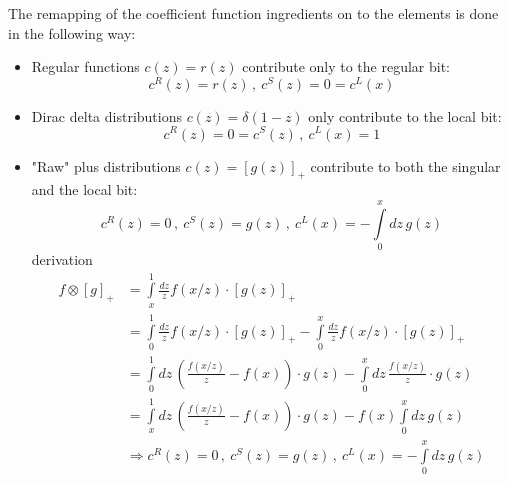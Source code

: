 The remapping of the coefficient function ingredients on to the \rsl elements
is done in the following way:
\begin{itemize}
  \item Regular functions $c(z) = r(z)$ contribute only to the regular bit:
    \begin{equation}
      c^R(z) = r(z)\,,~ c^S(z) = 0 = c^L(x)
    \end{equation}

  \item Dirac delta distributions $c(z) = \delta(1-z)$ only contribute to
    the local bit:
    \begin{equation}
      c^R(z) = 0 = c^S(z)\,,~ c^L(x) = 1
    \end{equation}

  \item "Raw" plus distributions $c(z) = \left[g(z)\right]_+$ contribute to
    both the singular and the local bit:
    \begin{equation}
      c^R(z) = 0\,,~ c^S(z) = g(z)\,,~ c^L(x) = -\int\limits_0^x\!dz\, g(z)
    \end{equation}
    derivation
    \begin{align}
        f \otimes [g]_+ &= \int\limits_x^1 \frac{dz}{z} f(x/z) \cdot \left[ g(z) \right]_+\\
          &= \int\limits_0^1 \frac{dz}{z} f(x/z) \cdot \left[ g(z) \right]_+ - \int\limits_0^x \frac{dz}{z} f(x/z) \cdot \left[ g(z) \right]_+\\
          &= \int\limits_0^1\!dz\, \left(\frac{f(x/z)}{z} - f(x)\right) \cdot g(z) - \int\limits_0^x\!dz\, \frac{f(x/z)}{z} \cdot g(z)\\
          &= \int\limits_x^1\!dz\, \left(\frac{f(x/z)}{z} - f(x)\right) \cdot g(z) - f(x) \int\limits_0^x\!dz\, g(z)\\
          &\Rightarrow c^R(z) = 0\,,~ c^S(z) = g(z)\,,~ c^L(x) = -\int\limits_0^x\!dz\, g(z)
    \end{align}


\end{itemize}
